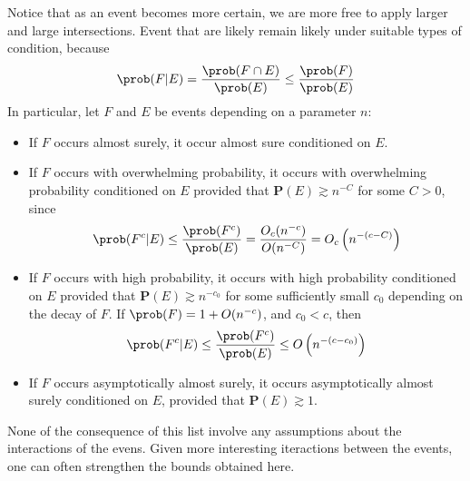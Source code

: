 %
Notice that as an event becomes more certain, we are more free to apply larger and large intersections. Event that are likely remain likely under suitable types of condition, because
%
\[ \prob(F|E) = \frac{\prob(F \cap E)}{\prob(E)} \leq \frac{\prob(F)}{\prob(E)} \]
%
In particular, let $F$ and $E$ be events depending on a parameter $n$:
%
\begin{itemize}
    \item If $F$ occurs almost surely, it occur almost sure conditioned on $E$.

    \item If $F$ occurs with overwhelming probability, it occurs with overwhelming probability conditioned on $E$ provided that $\mathbf{P}(E) \gtrsim n^{-C}$ for some $C > 0$, since
    \[ \prob(F^c|E) \leq \frac{\prob(F^c)}{\prob(E)} = \frac{O_c(n^{-c})}{O(n^{-C})} = O_c \left( n^{-(c - C)} \right) \]

    \item If $F$ occurs with high probability, it occurs with high probability conditioned on $E$ provided that $\mathbf{P}(E) \gtrsim n^{-c_0}$ for some sufficiently small $c_0$ depending on the decay of $F$. If $\prob(F) = 1 + O(n^{-c})$, and $c_0 < c$, then
    \[ \prob(F^c|E) \leq \frac{\prob(F^c)}{\prob(E)} \leq O \left(n^{-(c - c_0)} \right) \]

    \item If $F$ occurs asymptotically almost surely, it occurs asymptotically almost surely conditioned on $E$, provided that $\mathbf{P}(E) \gtrsim 1$.
\end{itemize}

None of the consequence of this list involve any assumptions about the interactions of the evens. Given more interesting iteractions between the events, one can often strengthen the bounds obtained here.





